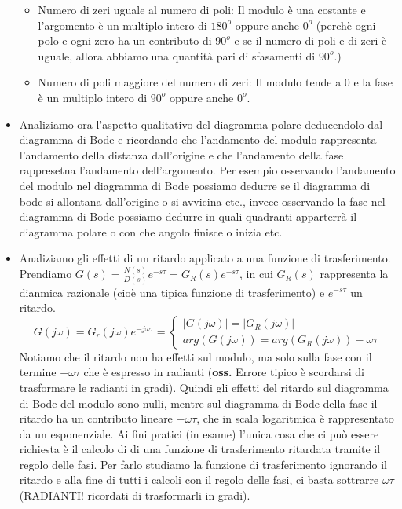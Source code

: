 \begin{itemize}
\begin{itemize}
        \item Numero di zeri uguale al numero di poli: Il modulo è una costante e l'argomento è un multiplo intero di $180^o$ oppure anche $0^o$ (perchè ogni polo e ogni zero ha un contributo di $90^o$ e se il numero di poli e di zeri è uguale, allora abbiamo una quantità pari di sfasamenti di $90^o$.)
        \item Numero di poli maggiore del numero di zeri: Il modulo tende a $0$ e la fase è un multiplo intero di $90^o$ oppure anche $0^o$.
    \end{itemize}
    \item Analiziamo ora l'aspetto qualitativo del diagramma polare deducendolo dal diagramma di Bode e ricordando che l'andamento del modulo rappresenta l'andamento della distanza dall'origine e che l'andamento della fase rappresetna l'andamento dell'argomento.\newline
    \newline
    Per esempio osservando l'andamento del modulo nel diagramma di Bode possiamo dedurre se il diagramma di bode si allontana dall'origine o si avvicina etc., invece osservando la fase nel diagramma di Bode possiamo dedurre in quali quadranti apparterrà il diagramma polare o con che angolo finisce o inizia etc.
    \item Analiziamo gli effetti di un ritardo applicato a una funzione di trasferimento. Prendiamo $G(s) = \frac{N(s)}{D(s)} e^{-s \tau} = G_R(s) e^{-s \tau}$, in cui $G_R(s)$ rappresenta la dianmica razionale (cioè una tipica funzione di trasferimento) e $e^{-s \tau}$ un ritardo.
    \[
        G(j \omega) = G_r(j \omega) e^{- j \omega \tau} = \begin{cases}
            |G(j \omega)| = |G_R(j \omega)|\\
            arg(G(j \omega)) = arg(G_R(j \omega)) - \omega \tau
        \end{cases}
    \]
    Notiamo che il ritardo non ha effetti sul modulo, ma solo sulla fase con il termine $- \omega \tau$ che è espresso in radianti (\textbf{oss.} Errore tipico è scordarsi di trasformare le radianti in gradi).\newline
    Quindi gli effetti del ritardo sul diagramma di Bode del modulo sono nulli, mentre sul diagramma di Bode della fase il ritardo ha un contributo lineare $- \omega \tau$, che in scala logaritmica è rappresentato da un esponenziale.\newline
    \newline
    Ai fini pratici (in esame) l'unica cosa che ci può essere richiesta è il calcolo di di una funzione di trasferimento ritardata tramite il regolo delle fasi. Per farlo studiamo la funzione di trasferimento ignorando il ritardo e alla fine di tutti i calcoli con il regolo delle fasi, ci basta sottrarre $\omega \tau$ (RADIANTI! ricordati di trasformarli in gradi). \newline

\end{itemize}
